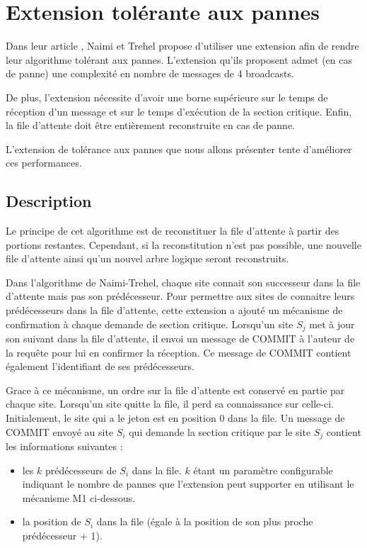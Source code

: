 
\chapter{Extension tolérante aux pannes}\label{fault-tolerant-ext}
Dans leur article \cite{naimi1996}, Naimi et Trehel propose d'utiliser une extension \cite{naimi1988} afin de rendre leur algorithme tolérant aux pannes. L'extension qu'ils proposent admet (en cas de panne) une complexité en nombre de messages de 4 broadcasts.

De plus, l'extension nécessite d'avoir une borne supérieure sur le temps de réception d'un message et sur le temps d'exécution de la section critique. Enfin, la file d'attente doit être entièrement reconstruite en cas de panne.

L'extension de tolérance aux pannes que nous allons présenter \cite{sopena2005} tente d'améliorer ces performances.

\section{Description}

Le principe de cet algorithme est de reconstituer la file d'attente à partir des portions restantes. Cependant, si la reconstitution n'est pas possible, une nouvelle file d'attente ainsi qu'un nouvel arbre logique seront reconstruits.

Dans l'algorithme de Naimi-Trehel, chaque site connait son successeur dans la file d'attente mais pas son prédécesseur. Pour permettre aux sites de connaitre leurs prédécesseurs dans la file d'attente, cette extension a ajouté un mécanisme de confirmation à chaque demande de section critique. Lorsqu'un site $S_j$ met à jour son suivant dans la file d'attente, il envoi un message de COMMIT à l'auteur de la requête pour lui en confirmer la réception. Ce message de COMMIT contient également l'identifiant de ses prédécesseurs.

Grace à ce mécanisme, un ordre sur la file d'attente est conservé en partie par chaque site. Lorsqu'un site quitte la file, il perd sa connaissance sur celle-ci. Initialement, le site qui a le jeton est en position $0$ dans la file. Un message de COMMIT envoyé au site  $S_i$ qui demande la section critique par le site $S_j$ contient les informations suivantes :

\begin{itemize}
\item les $k$ prédécesseurs de $S_i$ dans la file. $k$ étant un paramètre configurable indiquant le nombre de pannes que l'extension peut supporter en utilisant le mécanisme M1 ci-dessous.
\item la position de $S_i$ dans la file (égale à la position de son plus proche prédécesseur + 1). 
\end{itemize}

